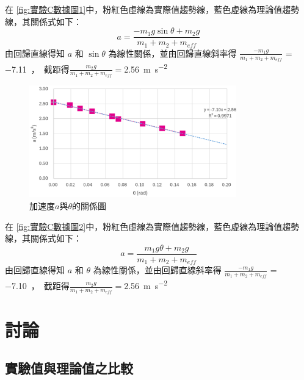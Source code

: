 \documentclass[11pt,a4paper]{article}
\theoremstyle{definition}
\begin{document}
            在 \autoref{fig:實驗C數據圖1}中，粉紅色虛線為實際值趨勢線，藍色虛線為理論值趨勢線，其關係式如下：
            \begin{equation}
                a = \frac{-m_1 g \sin\theta + m_2 g}{m_1 + m_2 + m_{eff}} \label{eq:theory_C1}
            \end{equation}
            由回歸直線得知 $a$ 和 $\sin{\theta}$ 為線性關係，並由回歸直線斜率得 $\displaystyle\frac{-m_1g}{m_1+m_2+m_{eff}}$ = \SI{-7.11}，截距得$\displaystyle\frac{m_2g}{m_1+m_2+m_{eff}} = $\SI{2.56}{\meter\per\second\squared}

            \begin{figure}[H]
                
                \centering
                \includegraphics[width=0.8\textwidth]{實驗C數據圖2.png}
                \caption{加速度$a$與$\theta$的關係圖
                }
                \label{fig:實驗C數據圖2}

            \end{figure}

            在 \autoref{fig:實驗C數據圖2}中，粉紅色虛線為實際值趨勢線，藍色虛線為理論值趨勢線，其關係式如下：
            \begin{equation}
                a = \frac{m_1 g \theta + m_2 g}{m_1 + m_2 + m_{eff}} \label{eq:theory_C2}
            \end{equation}
            由回歸直線得知 $a$ 和 $\theta$ 為線性關係，並由回歸直線斜率得 $\displaystyle\frac{-m_1g}{m_1+m_2+m_{eff}}$ = \SI{-7.10}，截距得$\displaystyle\frac{m_2g}{m_1+m_2+m_{eff}} = $\SI{2.56}{\meter\per\second\squared}

    \section{討論}

        \subsection{實驗值與理論值之比較}
\end{document}
